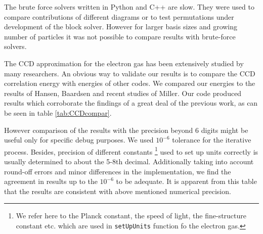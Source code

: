 \documentclass[twoside,english]{uiofysmaster}
\newcommand{\classname}[1]{\texttt{#1}}
\begin{document}
The brute force solvers written in Python and C++ are slow. They were
used to compare contributions of different diagrams or to test
permutations under development of the block solver. However for larger
basis sizes and growing number of particles it was not possible to
compare results with brute-force solvers.

The CCD approximation for the electron gas has been extensively studied by
many researchers. An obvious way to validate our results is to compare
the CCD correlation energy with energies of other codes. We compared our
energies to the results of Hansen\cite{HansenCoupledclusterstudies},
Baardsen \cite{BaardsenCoupledclustertheoryinfinite2014} and recent
studies of Miller\cite{MillerQuantumMechanicalStudies2017}. Our code
produced results which corroborate the findings of a great deal of the
previous work, as can be seen in table \ref{tab:CCDcompar}.

However comparison of the results with the precision beyond 6 digits
might be useful only for specific debug purposes. We used $10^{-6}$
tolerance for the iterative process. Besides, precision of different
constants \footnote{We refer here to the Planck constant, the speed of
	light, the fine-structure constant etc. which are used in
	\classname{setUpUnits} function fo the electron gas.} used to set up
units correctly is usually determined to about the 5-8th
decimal. Additionally taking into account round-off errors and minor
differences in the implementation, we find the agreement in results up
to the $10^{-6}$ to be adequate.  It is apparent from this table that
the results are consistent with above mentioned numerical precision.
\end{document}
